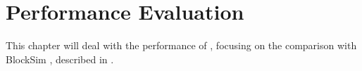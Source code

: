 \chapter{Performance Evaluation}\label{ch:performance}

This chapter will deal with the performance of \iblock{}, focusing on the
comparison with BlockSim \cite{blocksim}, described in
.




